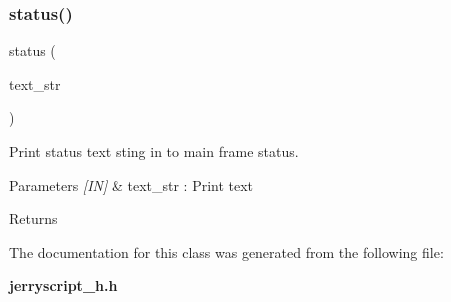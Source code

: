 \subsubsection{status()}
{\footnotesize\ttfamily status (\begin{DoxyParamCaption}\item[{text\+\_\+str}]{ }\end{DoxyParamCaption})}



Print status text sting in to main frame status. 


\begin{DoxyCode}{0}
\end{DoxyCode}



\begin{DoxyParams}{Parameters}
{\em \mbox{[}\+I\+N\mbox{]}} & text\+\_\+str \+: Print text \\
\hline
\end{DoxyParams}
\begin{DoxyReturn}{Returns}

\end{DoxyReturn}


The documentation for this class was generated from the following file\+:\begin{DoxyCompactItemize}
\item 
\textbf{ jerryscript\+\_\+h.\+h}\end{DoxyCompactItemize}
